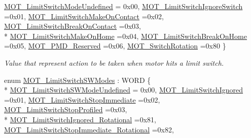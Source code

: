 \begin{DoxyCompactItemize}
\hyperlink{group___common_gga682c3ff98dc472fbdc3cbc3267d38796a5d1c87f59088fb4c61890ee9f7e396d8}{M\+O\+T\+\_\+\+Limit\+Switch\+Mode\+Undefined} = 0x00, 
\hyperlink{group___common_gga682c3ff98dc472fbdc3cbc3267d38796a4597f8cb8699917b05a17043355b6b4e}{M\+O\+T\+\_\+\+Limit\+Switch\+Ignore\+Switch} =0x01, 
\hyperlink{group___common_gga682c3ff98dc472fbdc3cbc3267d38796a71019889786145d78d206ebfe8532582}{M\+O\+T\+\_\+\+Limit\+Switch\+Make\+On\+Contact} =0x02, 
\hyperlink{group___common_gga682c3ff98dc472fbdc3cbc3267d38796a8ede426a957ea9aaccb56eb9fbdd65f3}{M\+O\+T\+\_\+\+Limit\+Switch\+Break\+On\+Contact} =0x03, 
\\*
\hyperlink{group___common_gga682c3ff98dc472fbdc3cbc3267d38796a6befefb68076e7c2ebd3a3174857d814}{M\+O\+T\+\_\+\+Limit\+Switch\+Make\+On\+Home} =0x04, 
\hyperlink{group___common_gga682c3ff98dc472fbdc3cbc3267d38796a0f7d30a1b18750e5d8d959c05ff16815}{M\+O\+T\+\_\+\+Limit\+Switch\+Break\+On\+Home} =0x05, 
\hyperlink{group___common_gga682c3ff98dc472fbdc3cbc3267d38796a4da0cb79d5cc0720c05912f0341b9365}{M\+O\+T\+\_\+\+P\+M\+D\+\_\+\+Reserved} =0x06, 
\hyperlink{group___common_gga682c3ff98dc472fbdc3cbc3267d38796a1940ea78ff85f568ed44abc65aa17e09}{M\+O\+T\+\_\+\+Switch\+Rotation} =0x80
 \}\begin{DoxyCompactList}\small\item\em Value that represent action to be taken when motor hits a limit switch. \end{DoxyCompactList}
\item 
enum \hyperlink{group___common_ga7d4db5fc799ed3fd24818bff565afd85}{M\+O\+T\+\_\+\+Limit\+Switch\+S\+W\+Modes} \+: W\+O\+RD \{ \\*
\hyperlink{group___common_gga7d4db5fc799ed3fd24818bff565afd85a4ad3d4ea235e662dc262a8590f1de2da}{M\+O\+T\+\_\+\+Limit\+Switch\+S\+W\+Mode\+Undefined} = 0x00, 
\hyperlink{group___common_gga7d4db5fc799ed3fd24818bff565afd85aa6281a52eae594413bbdd608ca38e00e}{M\+O\+T\+\_\+\+Limit\+Switch\+Ignored} =0x01, 
\hyperlink{group___common_gga7d4db5fc799ed3fd24818bff565afd85a5ad558f043ef9f21cb0d7adbbbd759a4}{M\+O\+T\+\_\+\+Limit\+Switch\+Stop\+Immediate} =0x02, 
\hyperlink{group___common_gga7d4db5fc799ed3fd24818bff565afd85ada5c4869e7fefa8f76f593d214c0c830}{M\+O\+T\+\_\+\+Limit\+Switch\+Stop\+Profiled} =0x03, 
\\*
\hyperlink{group___common_gga7d4db5fc799ed3fd24818bff565afd85a5aabe1197e36ba92db98dca8a959f243}{M\+O\+T\+\_\+\+Limit\+Switch\+Ignored\+\_\+\+Rotational} =0x81, 
\hyperlink{group___common_gga7d4db5fc799ed3fd24818bff565afd85a7bd2ef0ac74cc97d2e31566748690126}{M\+O\+T\+\_\+\+Limit\+Switch\+Stop\+Immediate\+\_\+\+Rotational} =0x82, 

\end{DoxyCompactItemize}
